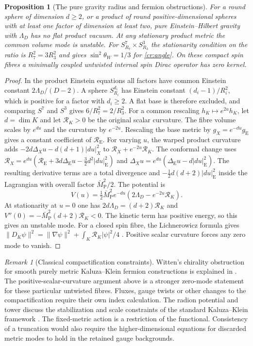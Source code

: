 \documentclass[aps,pra,onecolumn,superscriptaddress,nofootinbib,10pt]{revtex4-2}
\newtheorem{proposition}[theorem]{Proposition}
\theoremstyle{definition}
\theoremstyle{remark}
\newtheorem{remark}[theorem]{Remark}
\begin{document}
\begin{proposition}[The pure gravity radius and fermion obstructions]\label{cr:obstructions}
For a round sphere of dimension $d\ge2$, or a product of round
positive-dimensional spheres with at least one factor of dimension
at least two, pure Einstein--Hilbert gravity with $\Lambda_D$ has
no flat product vacuum. At any stationary product metric the common
volume mode is unstable. For $S^7_{R_7}\times S^3_{R_3}$ the
stationarity condition on the ratio is $R_7^2=3R_3^2$ and gives
$\sin^2\theta_W=1/3$ for \eqref{cr:angle}.
On these compact spin fibres a minimally coupled untwisted internal
spin Dirac operator has zero kernel.
\end{proposition}
\begin{proof}
In the product Einstein equations all factors have common Einstein
constant $2\Lambda_D/(D-2)$. A sphere $S^{d_i}_{R_i}$ has Einstein
constant $(d_i-1)/R_i^2$, which is positive for a factor with
$d_i\ge2$. A flat base is therefore excluded, and comparing $S^7$
and $S^3$ gives $6/R_7^2=2/R_3^2$. For a common rescaling
$h_K\mapsto e^{2u}h_K$, let $d=\dim K$ and let $\mathcal R_K>0$
be the original scalar curvature. The fibre volume scales by $e^{du}$
and the curvature by $e^{-2u}$. Rescaling the base metric by
$g_X=e^{-du}g_{\mathrm E}$ gives a constant coefficient of
$\mathcal R_{\mathrm E}$. For varying $u$, the warped product
curvature adds $-2d\Delta_X u-d(d+1)|du|_X^2$ to
$\mathcal R_X+e^{-2u}\mathcal R_K$. The conformal change
uses $\mathcal R_X=e^{du}(\mathcal R_{\mathrm E}
 +3d\Delta_{\mathrm E}u-\tfrac32d^2|du|_{\mathrm E}^2)$ and
$\Delta_X u=e^{du}(\Delta_{\mathrm E}u-d|du|_{\mathrm E}^2)$.
The resulting derivative terms are a total divergence and
$-\tfrac12 d(d+2)|du|_{\mathrm E}^2$ inside the Lagrangian
with overall factor $\bar M_{\mathrm P}^2/2$. The potential is
\[
 V(u)=\tfrac12\bar M_{\mathrm P}^2 e^{-du}
       (2\Lambda_D-e^{-2u}\mathcal R_K).
\]
At stationarity at $u=0$ one has $2d\Lambda_D=(d+2)\mathcal R_K$
and $V''(0)=-\bar M_{\mathrm P}^2(d+2)\mathcal R_K<0$.
The kinetic term has positive energy, so this gives an unstable mode.
For a
closed spin fibre, the Lichnerowicz formula gives
$\lVert D_K\psi\rVert^2=\lVert\nabla\psi\rVert^2+
\int_K\mathcal R_K|\psi|^2/4$ \cite[Ch.~II, \S8]{cr:lawson}. Positive scalar
curvature forces any zero mode to vanish.
\end{proof}

\begin{remark}[Classical compactification constraints]\label{cr:witten}
Witten's chirality obstruction for smooth purely metric
Kaluza--Klein fermion constructions is explained in
\cite[pp.~412--428]{cr:wittenkk}. The positive-scalar-curvature
argument above is a stronger zero-mode statement for these
particular untwisted fibres. Fluxes, gauge twists or other changes
to the compactification require their own index calculation.
The radion potential and tower discuss the stabilization and
scale constraints of the standard Kaluza--Klein framework
\cite{cr:duff,cr:cremmerscherk}. The fixed-metric action is a
restriction of the functional. Consistency of a truncation would
also require the higher-dimensional equations for discarded
metric modes to hold in the retained gauge backgrounds.
\end{remark}
\end{document}
